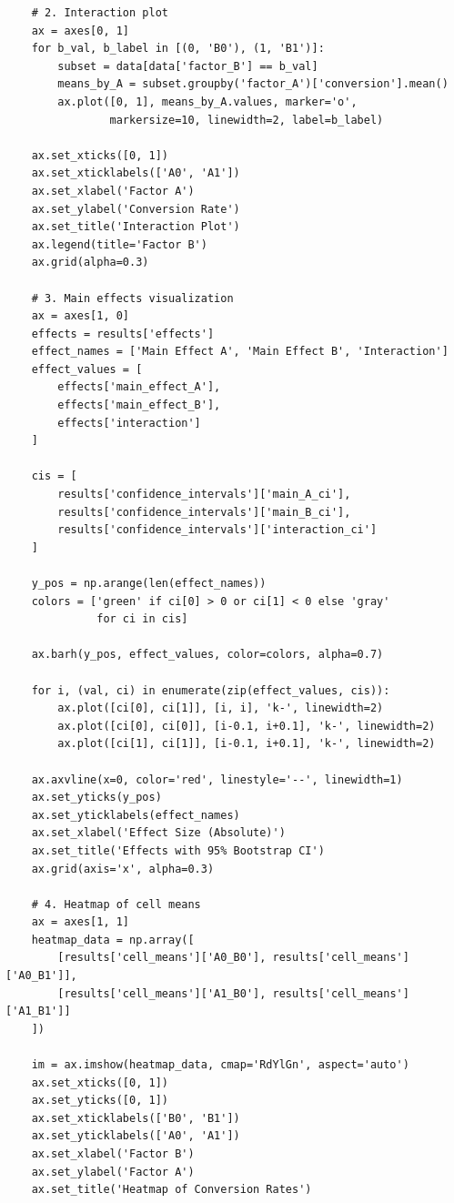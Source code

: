 \begin{lstlisting}
    # 2. Interaction plot
    ax = axes[0, 1]
    for b_val, b_label in [(0, 'B0'), (1, 'B1')]:
        subset = data[data['factor_B'] == b_val]
        means_by_A = subset.groupby('factor_A')['conversion'].mean()
        ax.plot([0, 1], means_by_A.values, marker='o',
                markersize=10, linewidth=2, label=b_label)

    ax.set_xticks([0, 1])
    ax.set_xticklabels(['A0', 'A1'])
    ax.set_xlabel('Factor A')
    ax.set_ylabel('Conversion Rate')
    ax.set_title('Interaction Plot')
    ax.legend(title='Factor B')
    ax.grid(alpha=0.3)

    # 3. Main effects visualization
    ax = axes[1, 0]
    effects = results['effects']
    effect_names = ['Main Effect A', 'Main Effect B', 'Interaction']
    effect_values = [
        effects['main_effect_A'],
        effects['main_effect_B'],
        effects['interaction']
    ]

    cis = [
        results['confidence_intervals']['main_A_ci'],
        results['confidence_intervals']['main_B_ci'],
        results['confidence_intervals']['interaction_ci']
    ]

    y_pos = np.arange(len(effect_names))
    colors = ['green' if ci[0] > 0 or ci[1] < 0 else 'gray'
              for ci in cis]

    ax.barh(y_pos, effect_values, color=colors, alpha=0.7)

    for i, (val, ci) in enumerate(zip(effect_values, cis)):
        ax.plot([ci[0], ci[1]], [i, i], 'k-', linewidth=2)
        ax.plot([ci[0], ci[0]], [i-0.1, i+0.1], 'k-', linewidth=2)
        ax.plot([ci[1], ci[1]], [i-0.1, i+0.1], 'k-', linewidth=2)

    ax.axvline(x=0, color='red', linestyle='--', linewidth=1)
    ax.set_yticks(y_pos)
    ax.set_yticklabels(effect_names)
    ax.set_xlabel('Effect Size (Absolute)')
    ax.set_title('Effects with 95% Bootstrap CI')
    ax.grid(axis='x', alpha=0.3)

    # 4. Heatmap of cell means
    ax = axes[1, 1]
    heatmap_data = np.array([
        [results['cell_means']['A0_B0'], results['cell_means']['A0_B1']],
        [results['cell_means']['A1_B0'], results['cell_means']['A1_B1']]
    ])

    im = ax.imshow(heatmap_data, cmap='RdYlGn', aspect='auto')
    ax.set_xticks([0, 1])
    ax.set_yticks([0, 1])
    ax.set_xticklabels(['B0', 'B1'])
    ax.set_yticklabels(['A0', 'A1'])
    ax.set_xlabel('Factor B')
    ax.set_ylabel('Factor A')
    ax.set_title('Heatmap of Conversion Rates')


\end{lstlisting}
